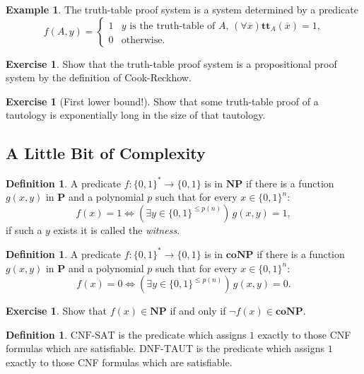 \documentclass{article}
\theoremstyle{definition}
\newtheorem{excs}[thrm]{Exercise}
\newtheorem{exmp}[thrm]{Example}
\newtheorem{defi}[thrm]{Definition}
\renewcommand{\P}{\textbf{P}}
\newcommand{\NP}{\textbf{NP}}
\newcommand{\coNP}{\textbf{coNP}}
\begin{document}
\begin{exmp}
    The truth-table proof system is a system determined by a predicate     
    \[f(A,y)=\begin{cases}
        1 & \text{$y$ is the truth-table of $A$, $(\forall \overline x) \textbf{tt}_A(\overline x)=1$,}\\
        0 & \text{otherwise.}
    \end{cases}\]
\end{exmp}

\begin{excs}
    Show that the truth-table proof system is a propositional proof system by the definition of Cook-Reckhow.
\end{excs}

\begin{excs}[First lower bound!]
    Show that some truth-table proof of a tautology is exponentially long in the size of that tautology.
\end{excs}


\subsection*{A Little Bit of Complexity}

\begin{defi}
    A predicate $f: \{0,1\}^* \to \{0,1\}$ is in $\NP$ if there is a function $g(x,y)$ in $\P$ and a polynomial $p$ such that for every $x\in \{0,1\}^n$:
    \[ f(x)=1 \iff (\exists y\in\{0,1\}^{\leq p(n)}) \, g(x,y)=1, \]
    if such a $y$ exists it is called the \emph{witness}.
\end{defi}

\begin{defi}
    A predicate $f: \{0,1\}^* \to \{0,1\}$ is in $\coNP$ if there is a function $g(x,y)$ in $\P$ and a polynomial $p$ such that for every $x\in \{0,1\}^n$:
    \[ f(x)=0 \iff (\exists y\in\{0,1\}^{\leq p(n)}) \, g(x,y)=0.\]
\end{defi}

\begin{excs}
    Show that $f(x)\in \NP$ if and only if $\lnot f(x) \in \coNP$. 
\end{excs}

\begin{defi}
    $\text{CNF-SAT}$ is the predicate which assigns $1$ exactly to those CNF formulas which are satisfiable.
    $\text{DNF-TAUT}$ is the predicate which assigns $1$ exactly to those CNF formulas which are satisfiable.
\end{defi}
\end{document}
